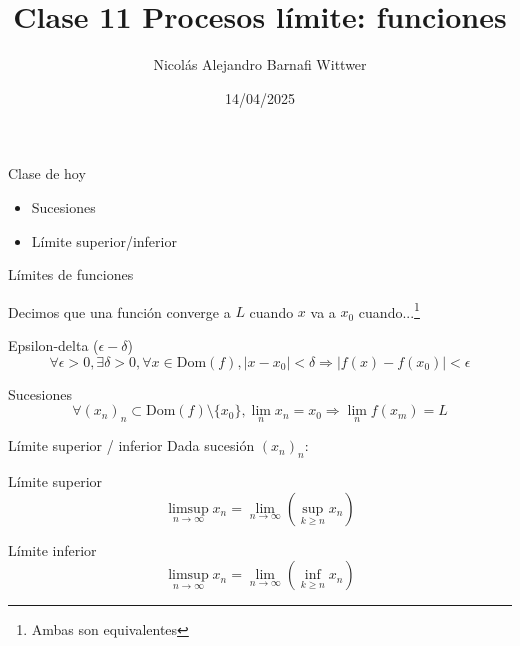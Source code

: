 \documentclass[14pt,aspectratio=169,xcolor=dvipsnames]{beamer}
\title[short title]{Clase 11 Procesos límite: funciones}
\subtitle{}
\author[NA Barnafi] {Nicolás Alejandro Barnafi Wittwer}
\institute[UC|CMM] 
{
    Pontificia Universidad Católica de Chile \\
    Centro de Modelamiento Matemático
}
\date{14/04/2025}
\begin{document}
\begin{frame}
    \maketitle
\end{frame}
\begin{frame}{Clase de hoy}
    \begin{itemize}
        \item Sucesiones
        \item Límite superior/inferior
    \end{itemize}

    \vspace{1cm}
\end{frame}
\begin{frame}{Límites de funciones}
    \begin{small}
        Decimos que una función converge a $L$ cuando $x$ va a $x_0$ cuando...\footnote{Ambas son equivalentes}
        \begin{block}{Epsilon-delta ($\epsilon-\delta$)}
            $$\forall \epsilon>0, \exists \delta >0, \forall x\in \text{Dom}(f), |x-x_0|<\delta \Rightarrow |f(x) - f(x_0)| < \epsilon $$
        \end{block}

        \begin{block}{Sucesiones}
            $$\forall (x_n)_n \subset \text{Dom}(f)\setminus \{x_0\}, \lim_n x_n = x_0 \Rightarrow \lim_n f(x_m) = L $$
        \end{block}
    \end{small}
\end{frame}
\begin{frame}{Límite superior / inferior}
    Dada sucesión $(x_n)_n$:
    \begin{block}{Límite superior}
        $$\limsup_{n\to\infty}x_n = \lim_{n\to\infty}\left(\sup_{k\geq n}x_n\right) $$
    \end{block}

    \begin{block}{Límite inferior}
        $$\limsup_{n\to\infty}x_n = \lim_{n\to\infty}\left(\inf_{k\geq n}x_n\right)$$
    \end{block}
\end{frame}
\end{document}
